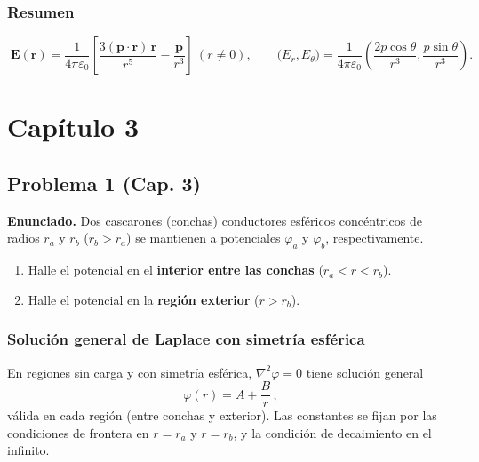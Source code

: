\documentclass{article}
\begin{document}
\subsubsection*{Resumen}
\[
\boxed{\;
\mathbf E(\mathbf r)=\frac{1}{4\pi\varepsilon_0}\left[
\frac{3(\mathbf p\!\cdot\!\mathbf r)\,\mathbf r}{r^{5}}-\frac{\mathbf p}{r^{3}}
\right]\ (r\neq 0),\qquad
\big(E_r,E_\theta\big)=\frac{1}{4\pi\varepsilon_0}\left(\frac{2p\cos\theta}{r^{3}},\frac{p\sin\theta}{r^{3}}\right).}
\]


\section{Capítulo 3}

\subsection{Problema 1 (Cap. 3)} \vspace{0.5cm}

\textbf{Enunciado.} Dos cascarones (conchas) conductores esféricos concéntricos de radios $r_a$ y $r_b$ ($r_b>r_a$) se mantienen a potenciales $\varphi_a$ y $\varphi_b$, respectivamente.
\begin{enumerate}[label=(\alph*)]
\item Halle el potencial en el \textbf{interior entre las conchas} ($r_a<r<r_b$).
\item Halle el potencial en la \textbf{región exterior} ($r>r_b$).
\end{enumerate}

\subsubsection*{Solución general de Laplace con simetría esférica}
En regiones sin carga y con simetría esférica, $\nabla^2\varphi=0$ tiene solución general
\[
\varphi(r)=A+\frac{B}{r}\,,
\]
válida en cada región (entre conchas y exterior). Las constantes se fijan por las condiciones de frontera en $r=r_a$ y $r=r_b$, y la condición de decaimiento en el infinito.

\end{document}
